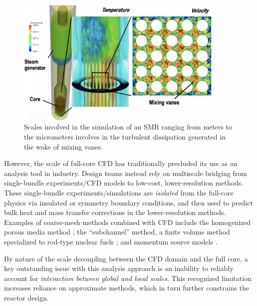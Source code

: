 \begin{figure}[!ht]
\centering
\includegraphics[width=0.9\textwidth]{figs/smr01.png}
 \caption{\label{fig:smr1} Scales involved in the simulation of an SMR ranging from meters to the micrometers involves in the turbulent dissipation generated in the wake of mixing vanes.}
\end{figure}

However, the
scale of full-core CFD has traditionally precluded its use as an analysis tool
in industry. Design teams instead rely on multiscale bridging from single-bundle
experiments/CFD models to low-cost, lower-resolution methods.
These single-bundle experiments/simulations are {\it isolated} from
the full-core physics via insulated or symmetry boundary conditions, and then used
to predict bulk heat and mass transfer corrections in the lower-resolution methods.
  Examples of coarse-mesh methods combined with CFD include the
homogenized porous media method \cite{wang2020c,Kim2020}; the ``subchannel'' method, a
finite volume method specialized to rod-type nuclear fuels \cite{blyth}; and
momentum source models \cite{hu2013}.

By nature of the scale decoupling between the CFD domain and the full core, a
key outstanding issue with this analysis approach is an inability to reliably
account for {\it interaction between global and local scales}. This recognized
limitation increases reliance on approximate methods, which in turn further
constrains the reactor design.

